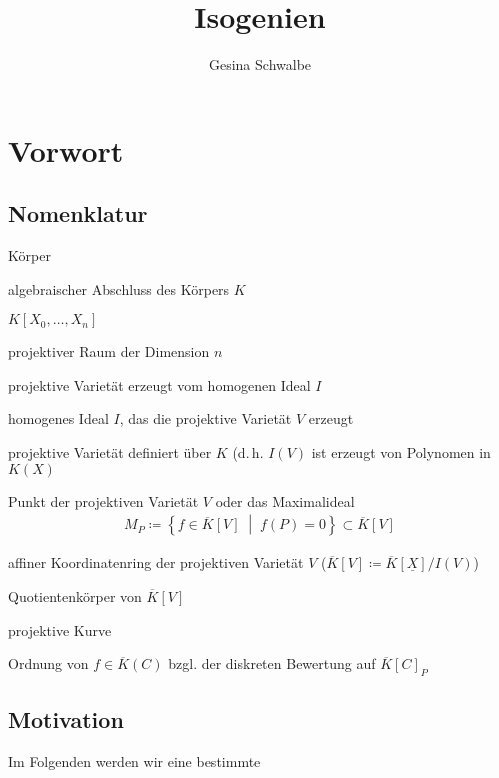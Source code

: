 \documentclass[english, german, parskip=half]{scrartcl}
\title{Isogenien}
\author{Gesina Schwalbe}
\theoremstyle{definition}
\theoremstyle{remark}
\newcommand*{\K}{\ensuremath{K}} %
\newcommand*{\algK}{\ensuremath{\overline K}} %
\renewcommand*{\P}{\ensuremath{\mathds{P}}} %
\newcommand*{\Xn}{\underline{X}} %
\DeclareMathOperator{\ord}{ord} %
\begin{document}
\maketitle
\tableofcontents

\section{Vorwort}

\subsection{Nomenklatur}
\begin{description}[labelwidth=1.5cm, font=\normalfont, itemsep=0pt]
  \item[$\K$] Körper
  \item[$\algK$] algebraischer Abschluss des Körpers $K$
  \item[${\K[\Xn]}$] $\K[X_0,\dotsc,X_n]$
  \item[$\P^n$] projektiver Raum der Dimension $n$
  \item[$V(I)$] projektive Varietät erzeugt vom homogenen Ideal $I$
  \item[$I(V)$] homogenes Ideal $I$, das die projektive Varietät $V$ erzeugt
  \item[$V/K$] projektive Varietät definiert über $\K$ (d.\,h. $I(V)$
    ist erzeugt von Polynomen in $\K(X)$
  \item[$P\in V$] Punkt der projektiven Varietät $V$ oder 
    das Maximalideal 
    \begin{gather*}
      M_P\coloneqq\left\{f\in\algK[V]\;\middle\vert\;f(P)=0\right\}
      \subset \algK[V]
    \end{gather*}
  \item[{$\algK[V]$}] affiner Koordinatenring der projektiven Varietät
    $V$ ($\algK[V]\coloneqq \algK[\Xn]/I(V)$)
  \item[{$\algK(V)$}] Quotientenkörper von $\algK[V]$
  \item[$C$] projektive Kurve
  \item[$\ord_P(f)$] Ordnung von $f\in\algK(C)$ bzgl. der diskreten
    Bewertung auf $\algK[C]_P$
\end{description}

\subsection{Motivation}
Im Folgenden werden wir eine bestimmte
\end{document}
